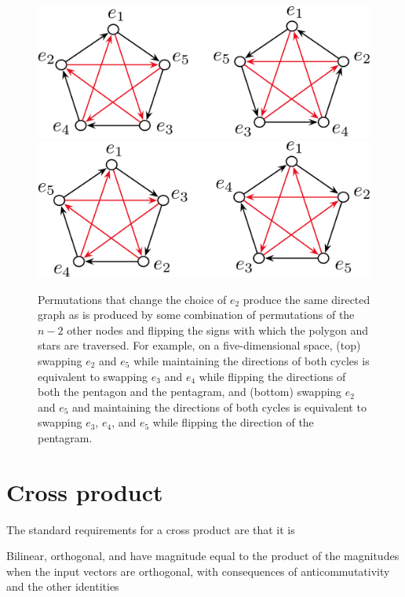 \documentclass[11pt]{article}
\newcommand{\bv}[1][]{e_{#1}}
\begin{document}
\begin{figure}[tbp]
\begin{center}
\includegraphics[width=.75\textwidth]{NoNeedToPermute2.pdf}\\
\includegraphics[width=.75\textwidth]{NoNeedToPermute2altalt.pdf}
\caption{%
Permutations that change the choice of $\bv[2]$ produce the same directed graph as is produced by some combination of permutations of the $n-2$ other nodes and flipping the signs with which the polygon and stars are traversed. For example, on a five-dimensional space, (top) swapping $\bv[2]$ and $\bv[5]$ while maintaining the directions of both cycles is equivalent to swapping $\bv[3]$ and $\bv[4]$ while flipping the directions of both the pentagon and the pentagram, and (bottom) swapping $\bv[2]$ and $\bv[5]$ and maintaining the directions of both cycles is equivalent to swapping $\bv[3]$, $\bv[4]$, and $\bv[5]$ while flipping the direction of the pentagram.
}
\label{default}
\end{center}
\end{figure}


\section{Cross product}

The standard requirements for a cross product are that it is

Bilinear, orthogonal, and have magnitude equal to the product of the magnitudes when the input vectors are orthogonal, with consequences of anticommutativity and the other identities
\end{document}
